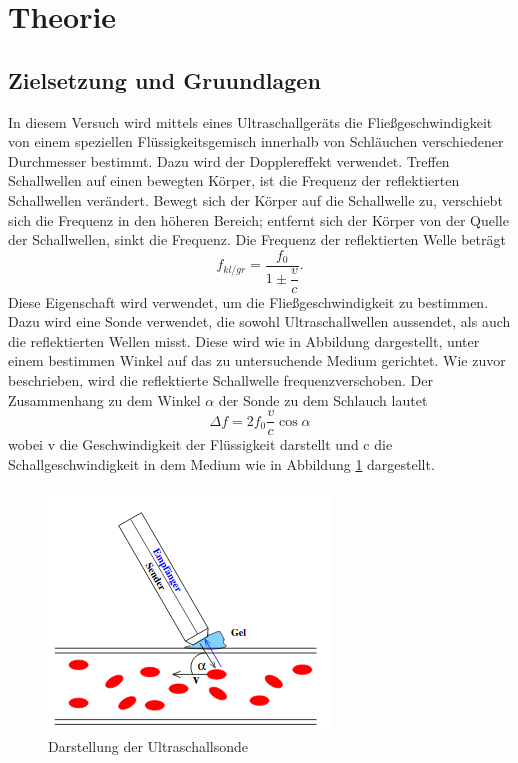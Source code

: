 \section{Theorie}
\label{sec:Theorie}

\subsection{Zielsetzung und Gruundlagen}
    In diesem Versuch wird mittels eines Ultraschallgeräts die Fließgeschwindigkeit von einem 
    speziellen Flüssigkeitsgemisch innerhalb von Schläuchen verschiedener Durchmesser
    bestimmt. Dazu wird der Dopplereffekt verwendet. Treffen Schallwellen auf einen bewegten Körper,
    ist die Frequenz der reflektierten Schallwellen verändert. Bewegt sich der Körper auf die 
    Schallwelle zu, verschiebt sich die Frequenz in den höheren Bereich; entfernt sich der Körper
    von der Quelle der Schallwellen, sinkt die Frequenz. Die Frequenz der reflektierten Welle 
    beträgt
    \begin{equation}
        f_{kl/gr}=\dfrac{f_0}{1\pm \dfrac{v}{c}}.
    \end{equation}
    Diese Eigenschaft wird verwendet, um die Fließgeschwindigkeit zu bestimmen. Dazu wird eine 
    Sonde verwendet, die sowohl Ultraschallwellen aussendet, als auch die reflektierten Wellen 
    misst. Diese wird wie in Abbildung dargestellt, unter einem bestimmen Winkel auf das zu 
    untersuchende Medium gerichtet. Wie zuvor beschrieben, wird die reflektierte Schallwelle
    frequenzverschoben. Der Zusammenhang zu dem Winkel $\alpha$ der Sonde zu dem Schlauch 
    lautet
    \begin{equation}
        \Delta f = 2 f_0 \dfrac{v}{c} \cos{\alpha}
    \end{equation}
    wobei v die Geschwindigkeit der Flüssigkeit darstellt und c die Schallgeschwindigkeit in 
    dem Medium wie in Abbildung \ref{fig:KeineAhnung2} dargestellt.
    \begin{figure}
        \centering
        \includegraphics{US3.png}
        \caption{Darstellung der Ultraschallsonde}
        \label{fig:KeineAhnung2}
    \end{figure}

